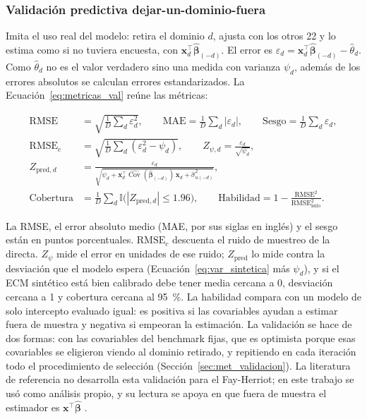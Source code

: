 \subsubsection{Validación predictiva dejar-un-dominio-fuera}

Imita el uso real del modelo: retira el dominio $d$, ajusta con los otros 22 y lo estima como si no tuviera encuesta, con $\mathbf{x}_d^\top\hat{\boldsymbol{\beta}}_{(-d)}$. El error es $\varepsilon_d = \mathbf{x}_d^\top\hat{\boldsymbol{\beta}}_{(-d)} - \hat{\theta}_d$. Como $\hat{\theta}_d$ no es el valor verdadero sino una medida con varianza $\psi_d$, además de los errores absolutos se calculan errores estandarizados. La Ecuación~\ref{eq:metricas_val} reúne las métricas:

\begin{equation}
\begin{aligned}
    \text{RMSE} &= \sqrt{\tfrac{1}{D}\textstyle\sum_d \varepsilon_d^2}, \qquad
    \text{MAE} = \tfrac{1}{D}\textstyle\sum_d |\varepsilon_d|, \qquad
    \text{Sesgo} = \tfrac{1}{D}\textstyle\sum_d \varepsilon_d, \\
    \text{RMSE}_{c} &= \sqrt{\tfrac{1}{D}\textstyle\sum_d \left(\varepsilon_d^2 - \psi_d\right)}, \qquad
    Z_{\psi,d} = \frac{\varepsilon_d}{\sqrt{\psi_d}}, \\
    Z_{\text{pred},d} &= \frac{\varepsilon_d}{\sqrt{\psi_d + \mathbf{x}_d^\top \widehat{\operatorname{Cov}}(\hat{\boldsymbol{\beta}}_{(-d)})\,\mathbf{x}_d + \hat{\sigma}^2_{u(-d)}}}, \\
    \text{Cobertura} &= \tfrac{1}{D}\textstyle\sum_d \mathbb{I}\big(|Z_{\text{pred},d}| \leq 1.96\big), \qquad
    \text{Habilidad} = 1 - \frac{\text{RMSE}^2}{\text{RMSE}^2_{\text{nulo}}} .
\end{aligned}
\label{eq:metricas_val}
\end{equation}

La RMSE, el error absoluto medio (MAE, por sus siglas en inglés) y el sesgo están en puntos porcentuales. $\text{RMSE}_c$ descuenta el ruido de muestreo de la directa. $Z_{\psi}$ mide el error en unidades de ese ruido; $Z_{\text{pred}}$ lo mide contra la desviación que el modelo espera (Ecuación~\ref{eq:var_sintetica} más $\psi_d$), y si el ECM sintético está bien calibrado debe tener media cercana a 0, desviación cercana a 1 y cobertura cercana al 95~\%. La habilidad compara con un modelo de solo intercepto evaluado igual: es positiva si las covariables ayudan a estimar fuera de muestra y negativa si empeoran la estimación. La validación se hace de dos formas: con las covariables del benchmark fijas, que es optimista porque esas covariables se eligieron viendo al dominio retirado, y repitiendo en cada iteración todo el procedimiento de selección (Sección~\ref{sec:met_validacion}). La literatura de referencia no desarrolla esta validación para el Fay-Herriot; en este trabajo se usó como análisis propio, y su lectura se apoya en que fuera de muestra el estimador es $\mathbf{x}^\top\hat{\boldsymbol{\beta}}$ \cite[p.~441]{morales2021smallarea}.

